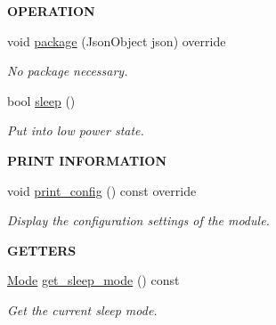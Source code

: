 \begin{Indent}{\bf O\+P\+E\+R\+A\+T\+I\+ON}\par
\begin{DoxyCompactItemize}
\item 
void \hyperlink{class_loom___sleep___manager_acbb98e60458aec76b9bf9ed446f17029}{package} (Json\+Object json) override
\begin{DoxyCompactList}\small\item\em No package necessary. \end{DoxyCompactList}\item 
bool \hyperlink{class_loom___sleep___manager_a640ace07af614eee3e7dda74a4d617c2}{sleep} ()
\begin{DoxyCompactList}\small\item\em Put into low power state. \end{DoxyCompactList}\end{DoxyCompactItemize}
\end{Indent}
\begin{Indent}{\bf P\+R\+I\+NT I\+N\+F\+O\+R\+M\+A\+T\+I\+ON}\par
\begin{DoxyCompactItemize}
\item 
void \hyperlink{class_loom___sleep___manager_a862cdfcf8c4cdba3aae5993a8ce0cff1}{print\+\_\+config} () const override
\begin{DoxyCompactList}\small\item\em Display the configuration settings of the module. \end{DoxyCompactList}\end{DoxyCompactItemize}
\end{Indent}
\begin{Indent}{\bf G\+E\+T\+T\+E\+RS}\par
\begin{DoxyCompactItemize}
\item 
\hyperlink{class_loom___sleep___manager_ab1cb2baaf00c386048490c3787a2de13}{Mode} \hyperlink{class_loom___sleep___manager_aa15266a651a882b39e4323e5a1248825}{get\+\_\+sleep\+\_\+mode} () const 
\begin{DoxyCompactList}\small\item\em Get the current sleep mode. \end{DoxyCompactList}\end{DoxyCompactItemize}
\end{Indent}
